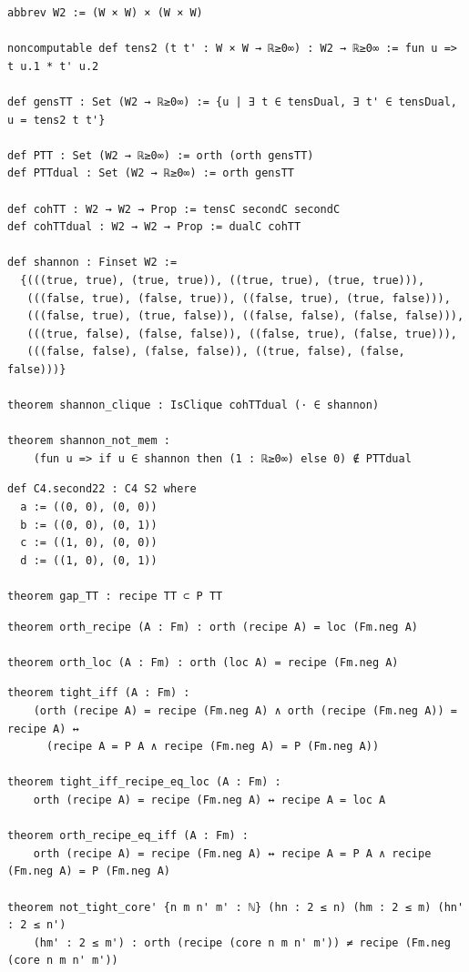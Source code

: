 \begin{lstlisting}
abbrev W2 := (W × W) × (W × W)

noncomputable def tens2 (t t' : W × W → ℝ≥0∞) : W2 → ℝ≥0∞ := fun u => t u.1 * t' u.2

def gensTT : Set (W2 → ℝ≥0∞) := {u | ∃ t ∈ tensDual, ∃ t' ∈ tensDual, u = tens2 t t'}

def PTT : Set (W2 → ℝ≥0∞) := orth (orth gensTT)
def PTTdual : Set (W2 → ℝ≥0∞) := orth gensTT

def cohTT : W2 → W2 → Prop := tensC secondC secondC
def cohTTdual : W2 → W2 → Prop := dualC cohTT

def shannon : Finset W2 :=
  {(((true, true), (true, true)), ((true, true), (true, true))),
   (((false, true), (false, true)), ((false, true), (true, false))),
   (((false, true), (true, false)), ((false, false), (false, false))),
   (((true, false), (false, false)), ((false, true), (false, true))),
   (((false, false), (false, false)), ((true, false), (false, false)))}

theorem shannon_clique : IsClique cohTTdual (· ∈ shannon)

theorem shannon_not_mem :
    (fun u => if u ∈ shannon then (1 : ℝ≥0∞) else 0) ∉ PTTdual
\end{lstlisting}

\begin{lstlisting}
def C4.second22 : C4 S2 where
  a := ((0, 0), (0, 0))
  b := ((0, 0), (0, 1))
  c := ((1, 0), (0, 0))
  d := ((1, 0), (0, 1))

theorem gap_TT : recipe TT ⊂ P TT
\end{lstlisting}

\begin{lstlisting}
theorem orth_recipe (A : Fm) : orth (recipe A) = loc (Fm.neg A)

theorem orth_loc (A : Fm) : orth (loc A) = recipe (Fm.neg A)
\end{lstlisting}

\begin{lstlisting}
theorem tight_iff (A : Fm) :
    (orth (recipe A) = recipe (Fm.neg A) ∧ orth (recipe (Fm.neg A)) = recipe A) ↔
      (recipe A = P A ∧ recipe (Fm.neg A) = P (Fm.neg A))

theorem tight_iff_recipe_eq_loc (A : Fm) :
    orth (recipe A) = recipe (Fm.neg A) ↔ recipe A = loc A

theorem orth_recipe_eq_iff (A : Fm) :
    orth (recipe A) = recipe (Fm.neg A) ↔ recipe A = P A ∧ recipe (Fm.neg A) = P (Fm.neg A)

theorem not_tight_core' {n m n' m' : ℕ} (hn : 2 ≤ n) (hm : 2 ≤ m) (hn' : 2 ≤ n')
    (hm' : 2 ≤ m') : orth (recipe (core n m n' m')) ≠ recipe (Fm.neg (core n m n' m'))
\end{lstlisting}

